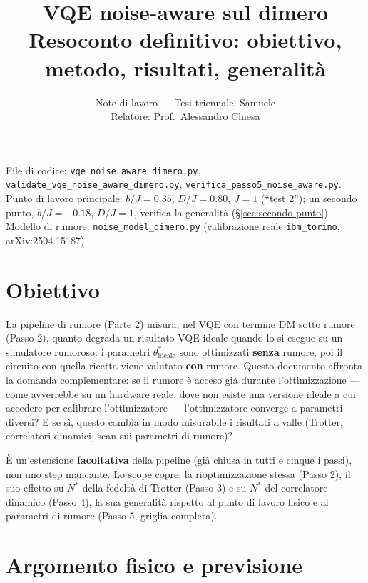 \documentclass[11pt,a4paper]{article}
\title{\vspace{-1.5em}\color{inkblue}VQE noise-aware sul dimero\\[0.2em]
\Large\normalfont\color{softgray}Resoconto definitivo: obiettivo, metodo, risultati, generalità}
\author{Note di lavoro --- Tesi triennale, Samuele\\ Relatore: Prof.\ Alessandro Chiesa}
\date{}
\begin{document}
\sloppy
\maketitle
\thispagestyle{fancy}
\vspace{-2.0em}

File di codice: \texttt{vqe\_noise\_aware\_dimero.py},
\texttt{validate\_vqe\_noise\_aware\_dimero.py},
\texttt{verifica\_passo5\_noise\_aware.py}. Punto di lavoro principale:
$b/J=0.35$, $D/J=0.80$, $J=1$ (``test 2''); un secondo punto,
$b/J=-0.18$, $D/J=1$, verifica la generalità (§\ref{sec:secondo-punto}).
Modello di rumore: \texttt{noise\_model\_dimero.py} (calibrazione reale
\texttt{ibm\_torino}, arXiv:2504.15187).

\tableofcontents

\section{Obiettivo}

La pipeline di rumore (Parte 2) misura, nel VQE con termine DM sotto
rumore (Passo 2), quanto degrada un
risultato VQE ideale quando lo si esegue su un simulatore rumoroso: i
parametri $\theta^*_\text{ideale}$ sono ottimizzati \textbf{senza}
rumore, poi il circuito con quella ricetta viene valutato \textbf{con}
rumore. Questo documento affronta la domanda complementare: se il rumore
è acceso già durante l'ottimizzazione --- come avverrebbe su un hardware
reale, dove non esiste una versione ideale a cui accedere per calibrare
l'ottimizzatore --- l'ottimizzatore converge a parametri diversi? E se
sì, questo cambia in modo misurabile i risultati a valle (Trotter,
correlatori dinamici, scan sui parametri di rumore)?

È un'estensione \textbf{facoltativa} della pipeline (già chiusa in tutti
e cinque i passi), non uno step mancante. Lo scope copre: la
rioptimizzazione stessa (Passo 2), il suo effetto su $N^*$ della
fedeltà di Trotter (Passo 3) e su $N^*$ del correlatore dinamico (Passo
4), la sua generalità rispetto al punto di lavoro fisico e ai parametri
di rumore (Passo 5, griglia completa).

\section{Argomento fisico e previsione}
\label{sec:argomento}
\end{document}

